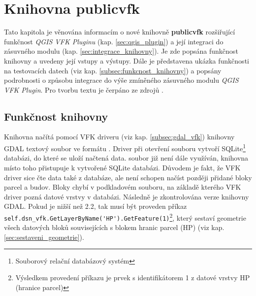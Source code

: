 \chapter{Knihovna publicvfk}
\label{4-plugin}
Tato kapitola je věnována informacím o nové knihovně
\textbf{publicvfk} rozšiřující funkčnost \textit{QGIS VFK Pluginu}
(kap. \ref{sec:qgis_plugin}) a její
integraci do zásuvného modulu (kap. \ref{sec:integrace_knihovny}). Je
zde popsána funkčnost knihovny a uvedeny
její vstupy a výstupy. Dále je představena ukázka funkčnosti na
testovacích datech (viz kap. \ref{subsec:funkcnost_knihovny}) a
popsány podrobnosti o způsobu integrace do výše zmíněného zásuvného
modulu \textit{QGIS VFK
  Plugin}. Pro tvorbu textu je čerpáno ze zdrojů \cite{cookbook,
  ucebnicepython}.

\section{Funkčnost knihovny}
\label{sec:funknost_knihovny}
Knihovna načítá pomocí VFK driveru (viz kap. \ref{subsec:gdal_vfk})
knihovny GDAL 
textový soubor ve formátu . Driver při otevření
souboru vytvoří SQLite\footnote{Souborový relační databázový systém} databázi,
do které se uloží načtená data.  soubor již není
dále využíván, knihovna místo toho přistupuje k vytvořené SQLite
databázi. Důvodem je fakt, že VFK driver sice čte data také z
databáze, ale není schopen načíst později přidané bloky parcel a
budov. Bloky chybí v podkladovém  souboru, na základě kterého
VFK driver pozná datové vrstvy v databázi. Následně je zkontrolována
verze knihovny GDAL. Pokud je nižší než 2.2, tak musí být proveden
příkaz \newline \verb|self.dsn_vfk.GetLayerByName('HP').GetFeature(1)|\footnote{Výsledkem provedení příkazu je prvek s identifikátorem 1 z datové vrstvy HP (hranice parcel)}, který sestaví geometrie všech datových bloků souvisejících s
blokem hranic parcel (HP) (viz kap. \ref{sec:sestaveni_geometrie}).

